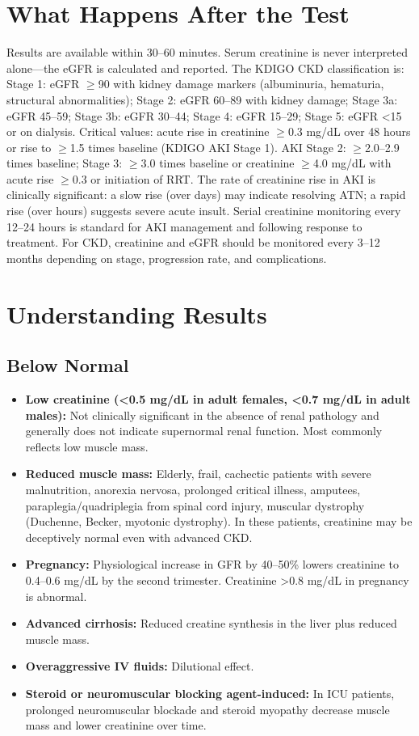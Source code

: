 \section*{What Happens After the Test}
Results are available within 30--60 minutes. Serum creatinine is never interpreted alone---the eGFR is calculated and reported. The KDIGO CKD classification is: Stage 1: eGFR $\geq$90 with kidney damage markers (albuminuria, hematuria, structural abnormalities); Stage 2: eGFR 60--89 with kidney damage; Stage 3a: eGFR 45--59; Stage 3b: eGFR 30--44; Stage 4: eGFR 15--29; Stage 5: eGFR <15 or on dialysis. Critical values: acute rise in creatinine $\geq$0.3 mg/dL over 48 hours or rise to $\geq$1.5 times baseline (KDIGO AKI Stage 1). AKI Stage 2: $\geq$2.0--2.9 times baseline; Stage 3: $\geq$3.0 times baseline or creatinine $\geq$4.0 mg/dL with acute rise $\geq$0.3 or initiation of RRT. The rate of creatinine rise in AKI is clinically significant: a slow rise (over days) may indicate resolving ATN; a rapid rise (over hours) suggests severe acute insult. Serial creatinine monitoring every 12--24 hours is standard for AKI management and following response to treatment. For CKD, creatinine and eGFR should be monitored every 3--12 months depending on stage, progression rate, and complications.

\section*{Understanding Results}

\subsection*{Below Normal}
\begin{itemize}
  \item \textbf{Low creatinine (<0.5 mg/dL in adult females, <0.7 mg/dL in adult males):} Not clinically significant in the absence of renal pathology and generally does not indicate supernormal renal function. Most commonly reflects low muscle mass.
  \item \textbf{Reduced muscle mass:} Elderly, frail, cachectic patients with severe malnutrition, anorexia nervosa, prolonged critical illness, amputees, paraplegia/quadriplegia from spinal cord injury, muscular dystrophy (Duchenne, Becker, myotonic dystrophy). In these patients, creatinine may be deceptively normal even with advanced CKD.
  \item \textbf{Pregnancy:} Physiological increase in GFR by 40--50\% lowers creatinine to 0.4--0.6 mg/dL by the second trimester. Creatinine >0.8 mg/dL in pregnancy is abnormal.
  \item \textbf{Advanced cirrhosis:} Reduced creatine synthesis in the liver plus reduced muscle mass.
  \item \textbf{Overaggressive IV fluids:} Dilutional effect.
  \item \textbf{Steroid or neuromuscular blocking agent-induced:} In ICU patients, prolonged neuromuscular blockade and steroid myopathy decrease muscle mass and lower creatinine over time.
\end{itemize}

